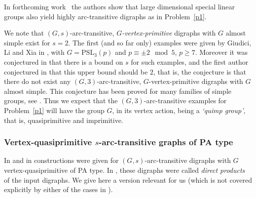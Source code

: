 \documentclass[11pt]{amsart}
\newcommand{\PSL}{\mathrm{PSL}}
\begin{document}
In forthcoming work~\cite{LP} the authors show that large dimensional special linear groups also yield highly arc-transitive digraphs as in Problem~\ref{p1}.  

We note that $(G,s)$-arc-transitive, \emph{$G$-vertex-primitive} digraphs with $G$ almost simple exist for $s=2$. The first (and so far only) examples were given by Giudici, Li and Xia in \cite{infinite}, with 
\(G=\PSL_{3}(p)\) and \(p\equiv \pm2\mod{5}\), \(p\geqslant7\). Moreover  it was conjectured in \cite[Question 2]{infinite} that there is a bound on $s$ for such examples, and the first author conjectured in \cite[Conjecture 1.3]{LChenThesis} that this upper bound should be $2$, that is, the conjecture is that there do not exist any $(G,3)$-arc-transitive, $G$-vertex-primitive digraphs with $G$ almost simple. This conjecture has been proved for many families of simple groups, see \cite{alternating2, reeandsuzuki,symplectic, alternating, exceptional}. Thus we expect that the $(G,3)$-arc-transitive examples for Problem~\ref{p1} will have the group $G$, in its vertex action, being a \emph{`quimp group'}, that is, quasiprimitive and imprimitive. %

\subsubsection{Vertex-quasiprimitive $s$-arc-transitive graphs of PA type}

In \cite[Lemma 2.7]{quasi} and in \cite[Proof of Proposition 4.2]{Praeger} constructions were given for $(G,s)$-arc-transitive digraphs with $G$ vertex-quasiprimitive of PA type. In \cite{quasi}, these digraphs were called \emph{direct products} of the input digraphs. We give here a version relevant for us (which is not covered explicitly by either of the cases in \cite{quasi, Praeger}).
\end{document}
